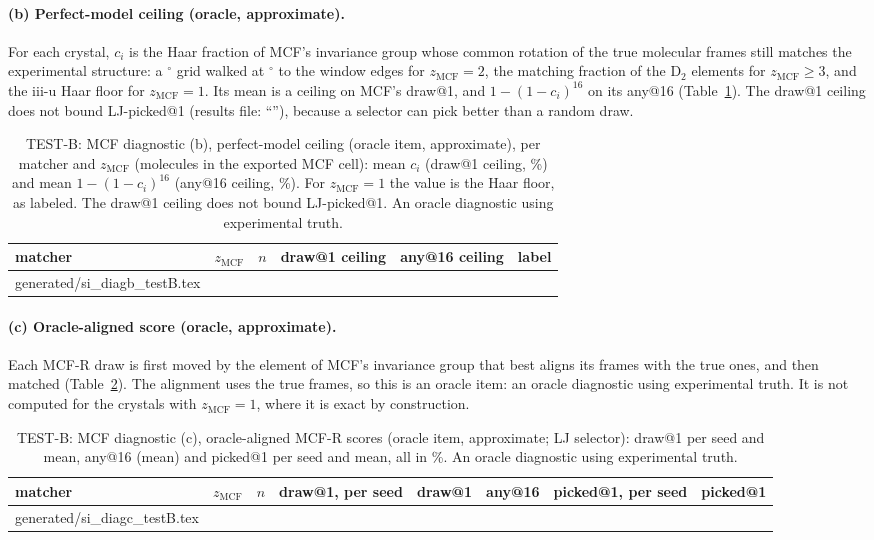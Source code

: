 \documentclass[journal=acsodf,manuscript=article]{achemso}
\makeatletter
\newcommand{\inputrows}[1]{\@@input #1 }
\makeatother
\begin{document}
\paragraph{(b) Perfect-model ceiling (oracle, approximate).} For each crystal, $c_i$ is the Haar
fraction of MCF's invariance group whose common rotation of the true molecular frames still
matches the experimental structure: a \svDiagBGrid$^\circ$ grid walked at \svDiagBWalk$^\circ$ to
the window edges for $z_\mathrm{MCF}=2$, the matching fraction of the D$_2$ elements for
$z_\mathrm{MCF}\ge3$, and the iii-u Haar floor for $z_\mathrm{MCF}=1$. Its mean is a ceiling on
MCF's draw@1, and $1-(1-c_i)^{16}$ on its any@16 (Table~\ref{tab:si_diagb}). The draw@1 ceiling
does not bound LJ-picked@1 (results file: ``\svDiagBNote''), because a selector can pick
better than a random draw.

\begin{table}[htbp]
\caption{TEST-B: MCF diagnostic (b), perfect-model ceiling (oracle item, approximate), per
matcher and $z_\mathrm{MCF}$ (molecules in the exported MCF cell): mean $c_i$ (draw@1 ceiling,
\%) and mean $1-(1-c_i)^{16}$ (any@16 ceiling, \%). For $z_\mathrm{MCF}=1$ the value is the
Haar floor, as labeled. The draw@1 ceiling does not bound LJ-picked@1. An oracle diagnostic
using experimental truth.}
\label{tab:si_diagb}
\centering
\small
\begin{tabular}{@{}lcrccl@{}}
\toprule
matcher & $z_\mathrm{MCF}$ & $n$ & draw@1 ceiling & any@16 ceiling & label \\
\midrule
\inputrows{generated/si_diagb_testB.tex}
\bottomrule
\end{tabular}
\end{table}

\paragraph{(c) Oracle-aligned score (oracle, approximate).} Each MCF-R draw is first moved by the
element of MCF's invariance group that best aligns its frames with the true ones, and then
matched (Table~\ref{tab:si_diagc}). The alignment uses the true frames, so this is an oracle
item: an oracle diagnostic using experimental truth. It is not computed for the \svDiagCZoneN{} crystals with $z_\mathrm{MCF}=1$, where
it is exact by construction.

\begin{table}[htbp]
\caption{TEST-B: MCF diagnostic (c), oracle-aligned MCF-R scores (oracle item, approximate; LJ
selector): draw@1 per seed and mean, any@16 (mean) and picked@1 per seed and mean, all in \%.
An oracle diagnostic using experimental truth.}
\label{tab:si_diagc}
\centering
\footnotesize
\setlength{\tabcolsep}{3pt}
\begin{tabular}{@{}lcrccccc@{}}
\toprule
matcher & $z_\mathrm{MCF}$ & $n$ & draw@1, per seed & draw@1 & any@16 & picked@1, per seed & picked@1 \\
\midrule
\inputrows{generated/si_diagc_testB.tex}
\bottomrule
\end{tabular}
\end{table}
\end{document}
